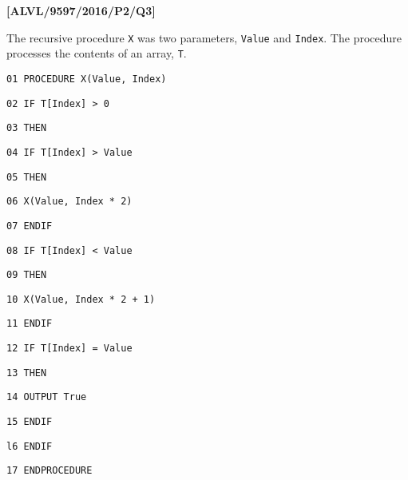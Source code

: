 \item \textbf{{[}ALVL/9597/2016/P2/Q3{]} }

The recursive procedure \texttt{X} was two parameters, \texttt{Value}
and \texttt{Index}. The procedure processes the contents of an array,
\texttt{T}.

\noindent %
\noindent\begin{minipage}[t]{1\columnwidth}%
\texttt{01 PROCEDURE X(Value, Index)}

\texttt{02 \qquad{}IF T{[}Index{]} > 0}

\texttt{03 \qquad{}\qquad{}THEN}

\texttt{04 \qquad{}\qquad{}\qquad{}IF T{[}Index{]} > Value}

\texttt{05 \qquad{}\qquad{}\qquad{}\qquad{}THEN}

\texttt{06 \qquad{}\qquad{}\qquad{}\qquad{}\qquad{}X(Value, Index
{*} 2) }

\texttt{07 \qquad{}\qquad{}\qquad{}ENDIF}

\texttt{08 \qquad{}\qquad{}\qquad{}IF T{[}Index{]} < Value}

\texttt{09 \qquad{}\qquad{}\qquad{}\qquad{}THEN}

\texttt{10 \qquad{}\qquad{}\qquad{}\qquad{}\qquad{}X(Value, Index
{*} 2 + 1) }

\texttt{11 \qquad{}\qquad{}\qquad{}ENDIF}

\texttt{12 \qquad{}\qquad{}\qquad{}IF T{[}Index{]} = Value}

\texttt{13 \qquad{}\qquad{}\qquad{}\qquad{}THEN}

\texttt{14 \qquad{}\qquad{}\qquad{}\qquad{}\qquad{}OUTPUT \textquotedbl True\textquotedbl}

\texttt{15 \qquad{}\qquad{}\qquad{}ENDIF}

\texttt{l6 \qquad{}ENDIF}

\texttt{17 ENDPROCEDURE}%
\end{minipage}
